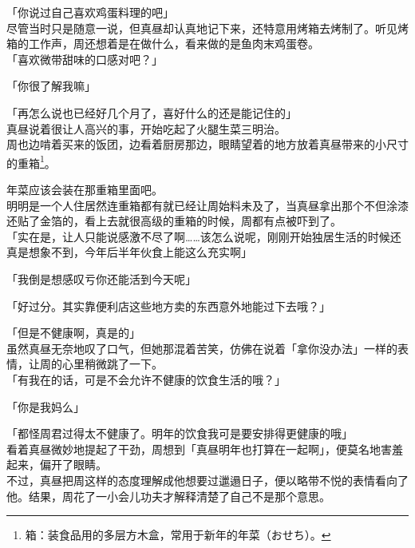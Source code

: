 「你说过自己喜欢鸡蛋料理的吧」\\

尽管当时只是随意一说，但真昼却认真地记下来，还特意用烤箱去烤制了。听见烤箱的工作声，周还想着是在做什么，看来做的是鱼肉末鸡蛋卷。\\

「喜欢微带甜味的口感对吧？」

「你很了解我嘛」

「再怎么说也已经好几个月了，喜好什么的还是能记住的」\\

真昼说着很让人高兴的事，开始吃起了火腿生菜三明治。\\

周也边啃着买来的饭团，边看着厨房那边，眼睛望着的地方放着真昼带来的小尺寸的重箱\footnote{箱：装食品用的多层方木盒，常用于新年的年菜（{\jpfont おせち}）。}。

年菜应该会装在那重箱里面吧。\\

明明是一个人住居然连重箱都有就已经让周始料未及了，当真昼拿出那个不但涂漆还贴了金箔的，看上去就很高级的重箱的时候，周都有点被吓到了。\\

「实在是，让人只能说感激不尽了啊……该怎么说呢，刚刚开始独居生活的时候还真是想象不到，今年后半年伙食上能这么充实啊」

「我倒是想感叹亏你还能活到今天呢」

「好过分。其实靠便利店这些地方卖的东西意外地能过下去哦？」

「但是不健康啊，真是的」\\

虽然真昼无奈地叹了口气，但她那混着苦笑，仿佛在说着「拿你没办法」一样的表情，让周的心里稍微跳了一下。\\

「有我在的话，可是不会允许不健康的饮食生活的哦？」

「你是我妈么」

「都怪周君过得太不健康了。明年的饮食我可是要安排得更健康的哦」\\

看着真昼微妙地提起了干劲，周想到「真昼明年也打算在一起啊」，便莫名地害羞起来，偏开了眼睛。\\

不过，真昼把周这样的态度理解成他想要过邋遢日子，便以略带不悦的表情看向了他。结果，周花了一小会儿功夫才解释清楚了自己不是那个意思。
